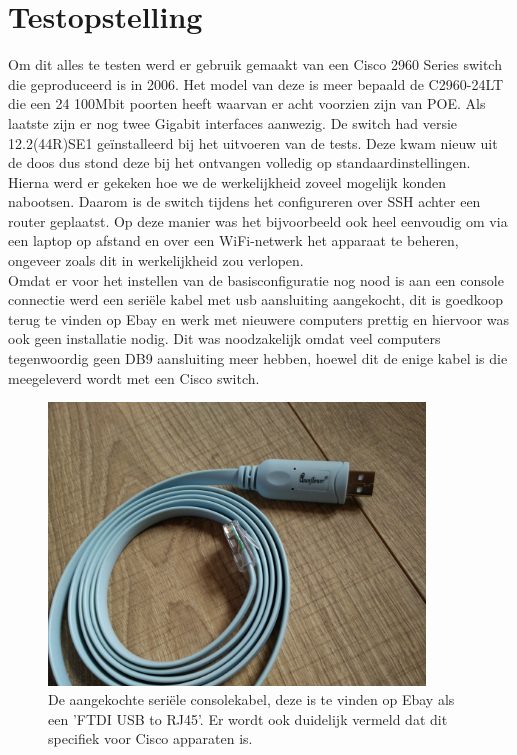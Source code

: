 
\chapter{Testopstelling}
\label{ch:testopstelling}
 
Om dit alles te testen werd er gebruik gemaakt van een Cisco 2960 Series switch die geproduceerd is in 2006. Het model van deze is meer bepaald de C2960-24LT die een 24 100Mbit poorten heeft waarvan er acht voorzien zijn van POE. Als laatste zijn er nog twee Gigabit interfaces aanwezig. De switch had versie 12.2(44R)SE1 geïnstalleerd bij het uitvoeren van de tests.
Deze kwam nieuw uit de doos dus stond deze bij het ontvangen volledig op standaardinstellingen. Hierna werd er gekeken hoe we de werkelijkheid zoveel mogelijk konden nabootsen. Daarom is de switch tijdens het configureren over SSH achter een router geplaatst. Op deze manier was het bijvoorbeeld ook heel eenvoudig om via een laptop op afstand en over een WiFi-netwerk het apparaat te beheren, ongeveer zoals dit in werkelijkheid zou verlopen.
\\

Omdat er voor het instellen van de basisconfiguratie nog nood is aan een console connectie werd een seriële kabel met usb aansluiting aangekocht, dit is goedkoop terug te vinden op Ebay en werk met nieuwere computers prettig en hiervoor was ook geen installatie nodig. Dit was noodzakelijk omdat veel computers tegenwoordig geen DB9 aansluiting meer hebben, hoewel dit de enige kabel is die meegeleverd wordt met een Cisco switch.

\begin{figure}[H]
\centering
\includegraphics[width=10cm]{../img/serialcable}
\caption{De aangekochte seriële consolekabel, deze is te vinden op Ebay als een 'FTDI USB to RJ45'. Er wordt ook duidelijk vermeld dat dit specifiek voor Cisco apparaten is. }
\end{figure}

